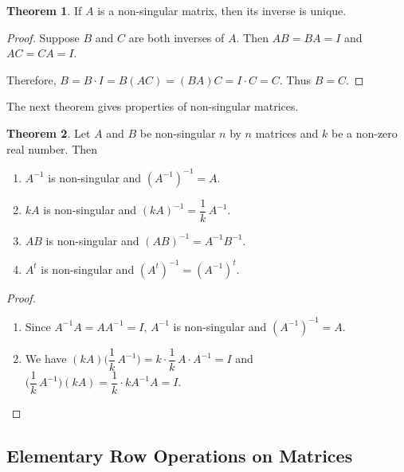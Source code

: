 \documentclass[11pt,a4paper]{article}
\theoremstyle{definition}
\newtheorem{thm}{Theorem}[subsection]
\begin{document}
\begin{thm}
If $A$ is a non-singular matrix, then its inverse is unique.
\end{thm}

\begin{proof}
Suppose $B$ and $C$ are both inverses of $A$. Then $AB=BA=I$ and $AC=CA=I$.

Therefore, $B=B\cdot I=B(AC)=(BA)C=I\cdot C=C$. Thus $B=C$.
\end{proof}
The next theorem gives properties of non-singular matrices.


\begin{thm}
Let $A$ and $B$ be non-singular $n$ by $n$ matrices and $k$ be a non-zero real number. Then
\begin{enumerate}
\item $A^{-1}$ is non-singular and $(A^{-1})^{-1}=A$.
\item $kA$ is non-singular and $(kA)^{-1}=\dfrac{1}{k}\,A^{-1}$.
\item $AB$ is non-singular and $(AB)^{-1}=A^{-1}B^{-1}$.
\item $A^t$ is non-singular and $(A^t)^{-1}=(A^{-1})^t$.
\end{enumerate}
\end{thm}


\begin{proof}
\begin{enumerate}
\item Since $A^{-1}A=AA^{-1}=I$, $A^{-1}$ is non-singular and $(A^{-1})^{-1}=A$.
\item We have $(kA)\Big(\dfrac{1}{k}\,A^{-1}\Big)=k\cdot\dfrac{1}{k}\,A\cdot A^{-1}=I$ and $\Big(\dfrac{1}{k}\,A^{-1}\Big)(kA)=\dfrac{1}{k}\cdot kA^{-1}A=I$.
\end{enumerate}
\end{proof}


\subsection{Elementary Row Operations on Matrices}
\end{document}
